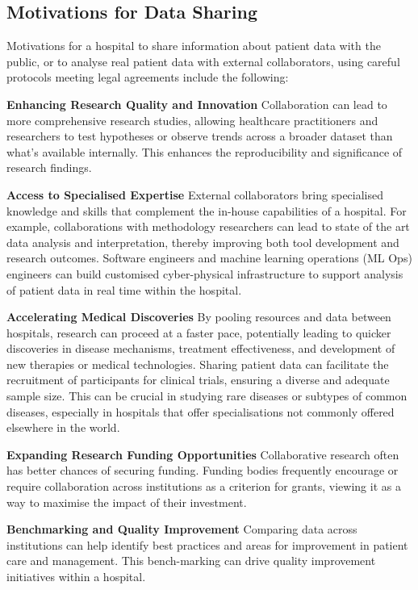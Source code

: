 \documentclass[11pt]{article}
\begin{document}
\subsection{Motivations for Data Sharing}

Motivations for a hospital to share information about patient data with the public, or to analyse real patient data with external collaborators, using careful protocols meeting legal agreements include the following:

\textbf{Enhancing Research Quality and Innovation} 
Collaboration can lead to more comprehensive research studies, allowing healthcare practitioners and researchers to test hypotheses or observe trends across a broader dataset than what's available internally. This enhances the reproducibility and significance of research findings.

\textbf{Access to Specialised Expertise} 
External collaborators bring specialised knowledge and skills that complement the in-house capabilities of a hospital. For example, collaborations with methodology researchers can lead to state of the art data analysis and interpretation, thereby improving both tool development and research outcomes. Software engineers and machine learning operations (ML Ops) engineers can build customised cyber-physical infrastructure to support analysis of patient data in real time within the hospital.

\textbf{Accelerating Medical Discoveries}
By pooling resources and data between hospitals, research can proceed at a faster pace, potentially leading to quicker discoveries in disease mechanisms, treatment effectiveness, and development of new therapies or medical technologies. Sharing patient data can facilitate the recruitment of participants for clinical trials, ensuring a diverse and adequate sample size. This can be crucial in studying rare diseases or subtypes of common diseases, especially in hospitals that offer specialisations not commonly offered elsewhere in the world. 

\textbf{Expanding Research Funding Opportunities} Collaborative research often has better chances of securing funding. Funding bodies frequently encourage or require collaboration across institutions as a criterion for grants, viewing it as a way to maximise the impact of their investment.

\textbf{Benchmarking and Quality Improvement} Comparing data across institutions can help identify best practices and areas for improvement in patient care and management. This bench-marking can drive quality improvement initiatives within a hospital.
\end{document}
